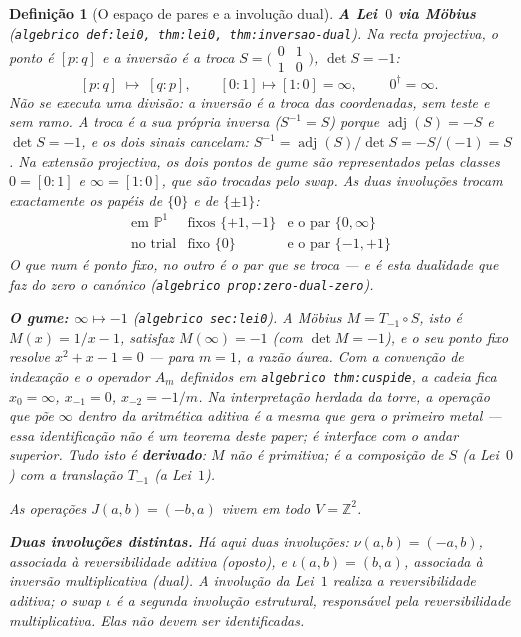 \documentclass[11pt,a4paper]{article}
\newtheorem{definicao}{Definição}
\newcommand{\code}[1]{\texttt{\small #1}}
\newcommand{\dg}{^{\dagger}}
\begin{document}
\begin{definicao}[O espaço de pares e a involução dual]
\medskip\noindent
\textbf{A Lei~$0$ via Möbius} (\code{algebrico def:lei0, thm:lei0,
thm:inversao-dual}). Na recta projectiva, o ponto é $[p:q]$ e a inversão é a
troca $S=\bigl(\begin{smallmatrix}0&1\\1&0\end{smallmatrix}\bigr)$,
$\det S=-1$:
\[
[p:q]\;\longmapsto\;[q:p],
\qquad
[0:1]\mapsto[1:0]=\infty,
\qquad
\boxed{\;0\dg=\infty.\;}
\]
Não se executa uma divisão: a inversão é a troca das coordenadas, sem teste e
sem ramo. A troca é a sua própria inversa ($S^{-1}=S$) porque
$\operatorname{adj}(S)=-S$ e $\det S=-1$, e os dois sinais cancelam:
$S^{-1}=\operatorname{adj}(S)/\det S = -S/(-1)=S$. Na extensão projectiva, os
dois pontos de gume são representados pelas classes $0=[0:1]$ e
$\infty=[1:0]$, que são trocadas pelo swap. As duas involuções trocam
exactamente os papéis de $\{0\}$ e de $\{\pm1\}$:
\[
\boxed{
\begin{array}{lll}
\text{em }\mathbb{P}^{1} & \text{fixos }\{+1,-1\}
  & \text{e o par }\{0,\infty\}\\[2pt]
\text{no trial} & \text{fixo }\{0\}
  & \text{e o par }\{-1,+1\}
\end{array}}
\]
O que num é ponto fixo, no outro é o par que se troca --- e é esta dualidade
que faz do zero o canónico (\code{algebrico prop:zero-dual-zero}).

\medskip\noindent\textbf{O gume: $\infty\mapsto-1$}
(\code{algebrico sec:lei0}). A Möbius $M=T_{-1}\circ S$, isto é $M(x)=1/x-1$,
satisfaz $M(\infty)=-1$ (com $\det M=-1$), e o seu ponto fixo resolve
$x^{2}+x-1=0$ --- para $m=1$, a razão áurea. Com a convenção de indexação e o operador $A_{m}$
definidos em \code{algebrico thm:cuspide}, a cadeia fica
$x_{0}=\infty$, $x_{-1}=0$, $x_{-2}=-1/m$.
Na interpretação herdada da torre, a operação que põe $\infty$ dentro da
aritmética aditiva é a mesma que gera o primeiro metal --- essa identificação
não é um teorema deste paper; é interface com o andar superior. Tudo isto é
\textbf{derivado}: $M$ não é primitiva; é a composição de $S$ (a Lei~$0$) com
a translação $T_{-1}$ (a Lei~$1$).

\medskip\noindent
As operações $J(a,b)=(-b,a)$ vivem em todo $V=\mathbb{Z}^{2}$.

\medskip\noindent
\textbf{Duas involuções distintas.} Há aqui duas involuções:
$\nu(a,b)=(-a,b)$, associada à reversibilidade aditiva (oposto), e
$\iota(a,b)=(b,a)$, associada à inversão multiplicativa (dual). A involução da
Lei~$1$ realiza a reversibilidade aditiva; o swap $\iota$ é a segunda
involução estrutural, responsável pela reversibilidade multiplicativa. Elas
não devem ser identificadas.


\end{definicao}
\end{document}
